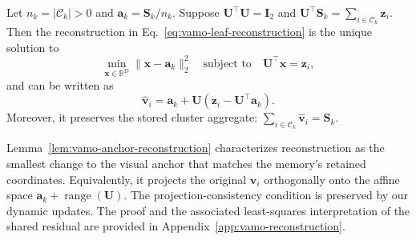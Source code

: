 \begin{lemma}
\label{lem:vamo-anchor-reconstruction}
Let $n_k=|\mathcal{C}_k|>0$ and
$\mathbf{a}_k=\mathbf{S}_k/n_k$.
Suppose $\mathbf{U}^{\top}\mathbf{U}=\mathbf{I}_2$ and
$\mathbf{U}^{\top}\mathbf{S}_k
=\sum_{i\in\mathcal{C}_k}\mathbf{z}_i$.
Then the reconstruction in
Eq.~\eqref{eq:vamo-leaf-reconstruction} is the unique solution to
\begin{equation}
\label{eq:vamo-constrained-reconstruction}
    \min_{\mathbf{x}\in\mathbb{R}^{D}}
    \|\mathbf{x}-\mathbf{a}_k\|_2^2
    \quad\text{subject to}\quad
    \mathbf{U}^{\top}\mathbf{x}=\mathbf{z}_i,
\end{equation}
and can be written as
\begin{equation}
\label{eq:vamo-anchor-correction}
    \hat{\mathbf{v}}_i
    =\mathbf{a}_k+
    \mathbf{U}(\mathbf{z}_i-\mathbf{U}^{\top}\mathbf{a}_k).
\end{equation}
Moreover, it preserves the stored cluster aggregate:
$\sum_{i\in\mathcal{C}_k}\hat{\mathbf{v}}_i=\mathbf{S}_k$.
\end{lemma}

Lemma~\ref{lem:vamo-anchor-reconstruction} characterizes reconstruction
as the smallest change to the visual anchor that matches the memory's
retained coordinates.
Equivalently, it projects the original $\mathbf{v}_i$ orthogonally
onto the affine space
$\mathbf{a}_k+\operatorname{range}(\mathbf{U})$.
The projection-consistency condition is preserved by our dynamic updates.
The proof and the associated least-squares interpretation of the shared
residual are provided in Appendix~\ref{app:vamo-reconstruction}.
